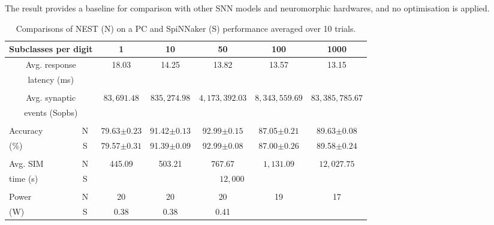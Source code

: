 \documentclass{frontiersENG} %
\begin{document}
The result provides a baseline for comparison with other SNN models and neuromorphic hardwares, and no optimisation is applied.
\begin{table}[h]
	\caption{Comparisons of NEST (N) on a PC and SpiNNaker (S) performance averaged over 10 trials.}
	\begin{center}
    \bgroup
    \def\arraystretch{1.4}
		\begin{tabular} {l| c  c c c c c}
		\multicolumn{2}{c}{Subclasses per digit} 
		& 1 & 10 & 50 & 100 & 1000 \\
		\hline
		\multicolumn{2}{c}{Avg. response}
		& \multirow{2}{*}{18.03} %
		& \multirow{2}{*}{14.25} %
		& \multirow{2}{*}{13.82} %
		& \multirow{2}{*}{13.57} %
		& \multirow{2}{*}{13.15} %
		\\
		\multicolumn{2}{c}{latency (ms)}
		& & & & &
		\\
    \multicolumn{7}{c}{\vspace*{-3mm}}\\
		\multicolumn{2}{c}{Avg. synaptic}
		& \multirow{2}{*}{$83,691.48$}
		& \multirow{2}{*}{$835,274.98$}
		& \multirow{2}{*}{$4,173,392.03$}
		& \multirow{2}{*}{$8,343,559.69$}
		& \multirow{2}{*}{$83,385,785.67$}
		\\	
		\multicolumn{2}{c}{events (Sopbs)}
		& & & & &
		\\
    \multicolumn{7}{c}{\vspace*{-3mm}}\\
		Accuracy
		& N 
		& 79.63$\pm0.23$
		& 91.42$\pm0.13$ 
		& 92.99$\pm0.15$
		& 87.05$\pm0.21$
		& 89.63$\pm0.08$
		\\
		(\%)
		& S
		& 79.57$\pm0.31$
		& 91.39$\pm0.09$
		& 92.99$\pm0.08$
		& 87.00$\pm0.26$
		& 89.58$\pm0.24$
		\\
    & &\multicolumn{5}{c}{\vspace*{-4mm}}\\
		Avg. SIM
		& N 
		& 445.09
		& 503.21
		& 767.67
		& $1,131.09$
		& $12,027.75$
		\\
		time (s)
		& S
		& \multicolumn{5}{c}{$12,000$}
		\\
    & &\multicolumn{5}{c}{\vspace*{-4mm}}\\
		Power
		& N 
		& 20
		& 20
		& 20
		& 19
		& 17
		\\
		(W) %
		& S
		& 0.38 
		& 0.38 
		& 0.41

\end{tabular}
\end{center}
\end{table}
\end{document}
